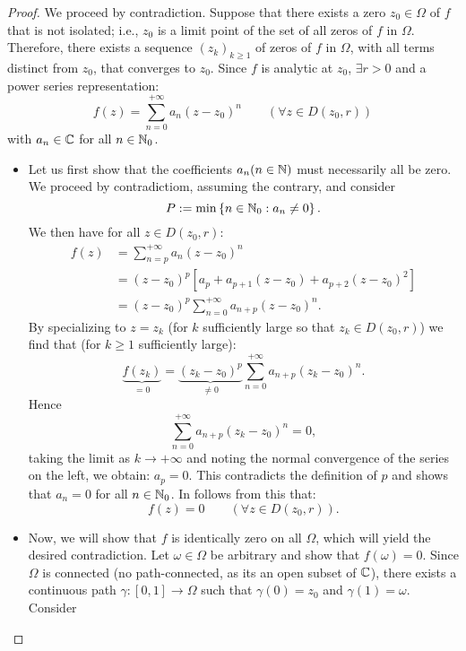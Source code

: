 \begin{proof}
We proceed by contradiction. Suppose that there exists a zero $z_0 \in   \Omega$ of $f$ that is not isolated; 
i.e., $z_0$ is a limit point of the set of all zeros of $f$ in $\Omega$. Therefore, there exists a sequence 
$(z_k ) _{k \geq 1}$ of zeros of $f$ in $\Omega$, with all terms distinct from $z_0$, that converges to $z_0$. Since
$f$ is analytic at $z_0$, $\exists  r > 0$ and a power series representation:
\[
f(z) = \sum_{n=0}^{+\infty} a_n (z-z_0) ^n \quad \quad (\forall  z \in   D(z_0, r) ) 
\]
with $a_n  \in   \mathbb{C} $ for all $n \in  \mathbb{N}_0$.
\begin{itemize}
  \item [\ding{50}\ding{172} ] Let us first show that the coefficients $ a _n (n \in  \mathbb{N}) $ must necessarily
    all be zero. We proceed by contradictiom, assuming the contrary, and consider
    \[
    P := \min \left\{ n \in  \mathbb{N}_0: a_n \neq 0 \right\}.
    \]
    We then have for all $z \in   D(z_0, r):$ 
    \begin{align*}
      f(z)  &= 
      \sum_{n=p}^{+\infty } 
      a_n (z-z_0) ^n  \\
            &= (z-z_0) ^{p} \left[ a_{p} + a_{p+1}(z-z_0)  + a_{p+2}(z-z_0) ^2  \right] \\
            &= (z-z_0) ^{p} \sum_{n=0}^{+\infty} a_{n+p} (z-z_0) ^n.
    \end{align*}
    By specializing to $z = z_k $ (for $k$ sufficiently large so that $z_k \in  D(z_0, r)$) we find that 
    (for $k \geq 1$ sufficiently large): 
    \[
    \underbrace{f(z_k )
    }_{=0}  = \underbrace{(z_k  - z_0)^{p}
    }_{\neq 0}   \sum_{n=0}^{+\infty} a_{n+p}(z_k -z_0) ^n.
    \]
    Hence
    \[
    \sum_{n=0}^{+\infty} a_{n+p} (z_k -z_0) ^n = 0 ,
    \]
    taking the limit as $k \rightarrow +\infty$ and noting the normal convergence 
    of the series on the left, we obtain: $a_{p} = 0.$  This contradicts the definition of $p$ and shows that 
    $a_n = 0$ for all $n \in  \mathbb{N}_0$. In follows from this that: 
    \[
    f(z)  = 0 \quad \quad (\forall  z \in   D(z_0, r) ).
    \]
  \item [ \ding{50} \ding{173} ] Now, we will show that $f$ is identically zero on all $\Omega$, which 
    will yield the desired contradiction. Let $\omega \in  \Omega$ be arbitrary and show that $f(\omega) =  0.$ 
    Since $\Omega$ is connected (no path-connected, as its an open subset of $\mathbb{C} $), there exists a continuous 
    path $ \gamma  : [0,1] \longrightarrow \Omega $ such that $\gamma (0) = z_0$ and $\gamma (1)  = \omega$. Consider

\end{itemize}
\end{proof}
